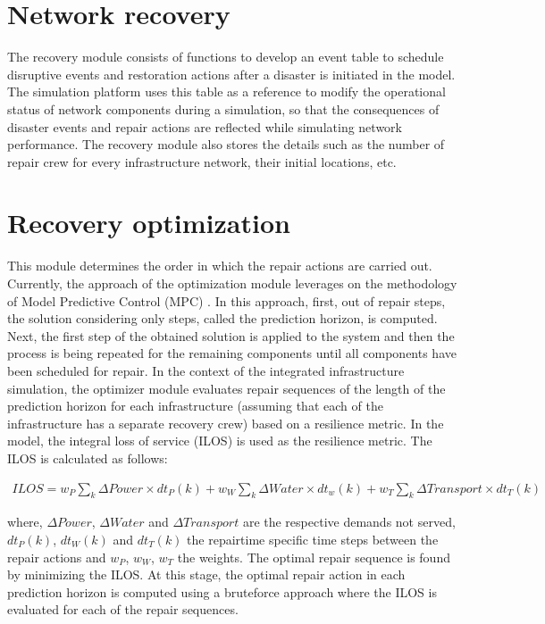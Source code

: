 \documentclass[letterpaper,12pt,english]{sphinxmanual}
\begin{document}
\section{Network recovery}
\label{\detokenize{index:network-recovery}}
\sphinxAtStartPar
The recovery module consists of functions to develop an event table to schedule disruptive events and restoration actions after a disaster
is initiated in the model. The simulation platform uses this table as a reference to modify the operational status of network components
during a simulation, so that the consequences of disaster events and repair actions are reflected while simulating network performance. The
recovery module also stores the details such as the number of repair crew for every infrastructure network, their initial locations, etc.


\section{Recovery optimization}
\label{\detokenize{index:recovery-optimization}}
\sphinxAtStartPar
This module determines the order in which the repair actions are carried out. Currently, the approach of the optimization module leverages
on the methodology of Model Predictive Control (MPC) \cite{Camacho2007}. In this approach, first, out of  repair steps, the solution considering only  steps,
called the prediction horizon, is computed. Next, the first step of the obtained solution is applied to the system and then the process is
being repeated for the remaining  components until all components have been scheduled for repair. In the context of the integrated infrastructure simulation, the optimizer module evaluates repair sequences of the length of the prediction horizon for each infrastructure (assuming that each of the infrastructure has a separate recovery crew) based on a resilience metric. In the model, the integral loss of service (ILOS) is used as the
resilience metric. The ILOS is calculated as follows:

\begin{equation}
\begin{split}ILOS = w_{P}\sum_{k}\Delta Power\times dt_{P}(k)+w_{W}\sum_{k}\Delta Water\times dt_{w}(k)+w_{T}\sum_{k}\Delta Transport\times dt_{T}(k)\end{split}
\end{equation}

\sphinxAtStartPar
where, \(\Delta Power\), \(\Delta Water\) and \(\Delta Transport\) are the respective demands not served, \(dt_{P}(k)\), \(dt_{W}(k)\) and \(dt_{T}(k)\) the repair\sphinxhyphen{}time specific time steps between the repair actions and \(w_{P}\), \(w_{W}\), \(w_{T}\) the weights. The optimal repair sequence is found by minimizing the ILOS. At this stage, the optimal repair action in each prediction horizon is computed using a brute\sphinxhyphen{}force approach where the ILOS is evaluated for each of the repair sequences.
\end{document}
